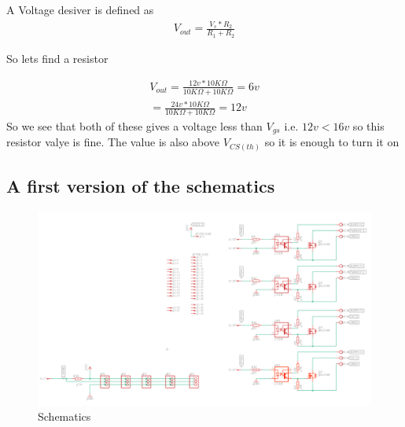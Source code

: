 \documentclass{article}
\begin{document}
A Voltage desiver is defined as
 \begin{equation}
 \begin{multlined}
V_{out} = \frac{V_s * R_2}{R_1+R_2}
\end{multlined}
\end{equation}

So lets find a resistor

 \begin{equation}
 \begin{multlined}
V_{out} = \frac{12v * 10K\Omega}{10K\Omega+10K\Omega} = 6v \\
 = \frac{24v * 10K\Omega}{10K\Omega+10K\Omega} = 12v 
\end{multlined}
\end{equation}
So we see that both of these gives a voltage less than $V_{gs}$ i.e. $12v < 16v$ so this resistor valye is fine. The value is also above $V_{CS(th)}$ so it is enough to turn it on


\subsection{A first version of the schematics}

\begin{figure}[!hpt]
\includegraphics[scale=0.2]{schematics.png}

\caption{Schematics}
\label{fig:schematics}
\end{figure}
\end{document}
